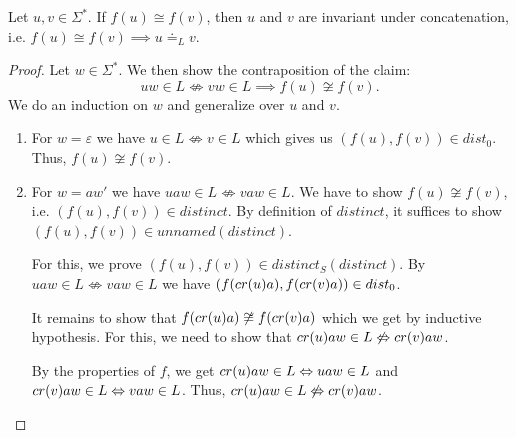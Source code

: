 \begin{lemma}
    \label{equiv_final}

    Let $u,v \in \Sigma^*$. 
    If $f(u) \cong f(v)$, then $u$ and $v$ are invariant under concatenation, i.e. $f(u) \cong f(v) \implies u \doteq_L v$.
\end{lemma}
\begin{proof}
    Let $w \in \Sigma^*$. We then show the contraposition of the claim: 
    \begin{equation*}
        uw \in L \not\Leftrightarrow vw \in L \implies f(u) \not\cong f(v).
    \end{equation*}    
    We do an induction on $w$ and generalize over $u$ and $v$.
    \begin{enumerate}
        \item For $w = \varepsilon$ we have $u \in L \not\Leftrightarrow v \in L$ which gives us $(f(u),f(v)) \in dist_0$.
            Thus, $f(u) \not\cong f(v)$.
        \item For $w = aw'$ we have $uaw \in L \not\Leftrightarrow vaw \in L$.
            We have to show $f(u) \not\cong f(v)$, i.e. $(f(u), f(v)) \in \mathit{distinct}$.
            By definition of $\mathit{distinct}$, it suffices to show $(f(u), f(v)) \in \mathit{unnamed}(\mathit{distinct})$.

             For this, we prove $(f(u), f(v)) \in \mathit{distinct_S}(\mathit{distinct})$. 
             By $uaw \in L \not\Leftrightarrow vaw \in L$ we have $(f(cr(u)a), f(cr(v)a)) \in dist_0$.

             It remains to show that $f(cr(u)a) \not\cong f(cr(v)a)$ which we get by inductive hypothesis.
             For this, we need to show that $cr(u)aw \in L \not\Leftrightarrow cr(v)aw$.

             By the properties of $f$, we get $cr(u)aw \in L \Leftrightarrow uaw \in L$ and $cr(v)aw \in L \Leftrightarrow vaw \in L$.
             Thus, $cr(u)aw \in L \not\Leftrightarrow cr(v)aw$.
             
    \end{enumerate}
\end{proof}


